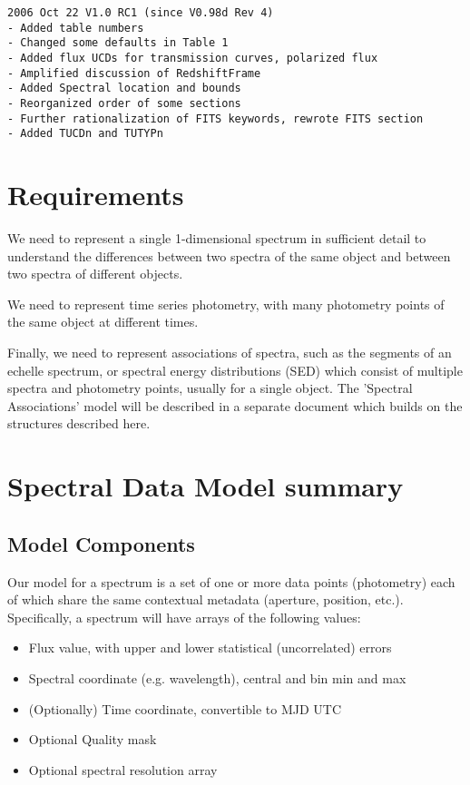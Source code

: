 \documentclass[11pt]{article}
\begin{document}
\begin{verbatim}
2006 Oct 22 V1.0 RC1 (since V0.98d Rev 4)
- Added table numbers
- Changed some defaults in Table 1
- Added flux UCDs for transmission curves, polarized flux
- Amplified discussion of RedshiftFrame
- Added Spectral location and bounds
- Reorganized order of some sections
- Further rationalization of FITS keywords, rewrote FITS section
- Added TUCDn and TUTYPn
\end{verbatim}

\clearpage

\section{Requirements}

We need to represent a single 1-dimensional spectrum in sufficient
detail to understand the differences between two spectra of the same
object and between two spectra of different objects.

We need to represent time series photometry, with many photometry points
of the same object at different times.

Finally, we need to represent associations of spectra,
such as the segments of an echelle spectrum, or
spectral energy distributions (SED) which
consist of multiple spectra and photometry points, usually for a single
object. The 'Spectral Associations' model will be described in
a separate document which builds on the structures described here.

\section{Spectral Data Model summary}

\subsection{Model Components}

Our model for a spectrum is a set of one or more data points (photometry)  each of
which share the same contextual metadata  (aperture, position,
etc.). Specifically, a spectrum
will have arrays of the following values:

\vskip 0.1in

\colorbox{ipink}{
\begin{minipage}{0.9\textwidth}

\begin{itemize}
\item Flux value, with upper and lower statistical (uncorrelated) errors 
\item Spectral coordinate  (e.g. wavelength), central and bin min and max 
\item (Optionally) Time coordinate, convertible to MJD UTC
\item Optional Quality mask
\item Optional spectral resolution array
\end{itemize}
\end{minipage}
}
\end{document}
